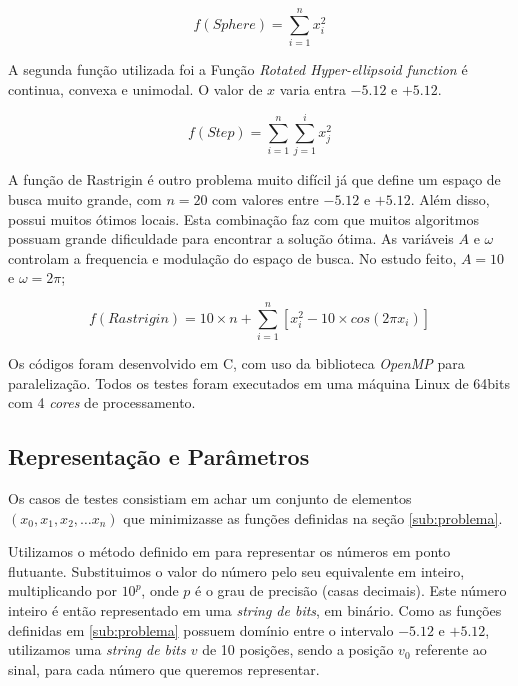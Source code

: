 \documentclass[12pt]{article}
\begin{document}
\begin{equation} \label{eq:spher}
  f(Sphere) = \sum_{i = 1}^{n} x_{i}^2
\end{equation}

A segunda função utilizada foi a Função \emph{Rotated Hyper-ellipsoid function} é continua, convexa e unimodal. O valor de $x$ varia entra $-5.12$ e $+5.12$.

\begin{equation} \label{eq:step}
  f(Step) = \sum_{i = 1}^{n}\sum_{j=1}^{i} x_j^2
\end{equation}

A função de Rastrigin é outro problema muito difícil já que define um espaço de busca muito grande, com $n = 20$ com valores entre $-5.12$ e $+5.12$. Além disso, possui muitos ótimos locais. Esta combinação faz com que muitos algoritmos possuam grande dificuldade para encontrar a solução ótima. As variáveis $A$ e $\omega$ controlam a frequencia e modulação do espaço de busca. No estudo feito, $A = 10$ e $\omega = 2\pi$;

\begin{equation} \label{eq:rast}
  f(Rastrigin) = 10 \times n + \sum_{i=1}^{n} \left[ x_{i}^2 - 10 \times cos(2 \pi x_i)\right]
\end{equation}



Os códigos foram desenvolvido em C, com uso da biblioteca \emph{OpenMP} para paralelização. Todos os testes foram executados em uma máquina Linux de 64bits com 4 \emph{cores} de processamento.


\subsection{Representação e Parâmetros} %
\label{sub:representacao}

Os casos de testes consistiam em achar um conjunto de elementos $(x_0, x_1, x_2, \dots x_n)$ que minimizasse as funções definidas na seção \ref{sub:problema}.

Utilizamos o método definido em \cite[p. 3]{gasurvey} para representar os números em ponto flutuante. Substituimos o valor do número pelo seu equivalente em inteiro, multiplicando por $10^p$, onde $p$ é o grau de precisão (casas decimais). Este número inteiro é então representado em uma \emph{string de bits}, em binário. Como as funções definidas em \ref{sub:problema} possuem domínio entre o intervalo $-5.12$ e $+5.12$, utilizamos uma \emph{string de bits $v$} de 10 posições, sendo a posição $v_0$ referente ao sinal, para cada número que queremos representar.
\end{document}
